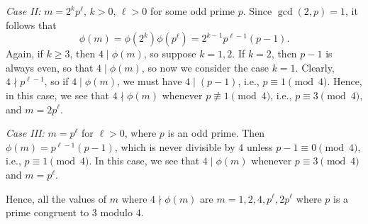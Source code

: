 \documentclass{article}
\begin{document}
\begin{exercise}[Chapter 11, \#2]
\begin{solution}
\textit{Case II:} $m = 2^kp^\ell$, $k > 0$, $\ell > 0$ for some odd prime $p$. Since $\gcd(2, p) = 1$, it follows that
$$\phi(m) = \phi(2^k)\phi(p^\ell) = 2^{k-1}p^{\ell - 1}(p - 1).$$
Again, if $k\geq 3$, then $4\mid \phi(m)$, so suppose $k = 1, 2$. If $k=2$, then $p-1$ is always even, so that $4\mid \phi(m)$, so now we consider the case $k=1$. Clearly, $4\nmid p^{\ell- 1}$, so if $4\mid \phi(m)$, we must have $4\mid (p-1)$, i.e., $p\equiv 1\pmod 4$. Hence, in this case, we see that $4\nmid \phi(m)$ whenever $p\not\equiv 1\pmod 4$, i.e., $p\equiv 3\pmod 4$, and $m = 2p^\ell$.

\textit{Case III:} $m = p^\ell$ for $\ell > 0$, where $p$ is an odd prime. Then $\phi(m) = p^{\ell-1}(p -1)$, which is never divisible by $4$ unless $p-1 \equiv 0 \pmod 4$, i.e., $p\equiv 1\pmod 4$. In this case, we see that $4\mid \phi(m)$ whenever $p\equiv 3\pmod 4$ and $m = p^\ell$.

Hence, all the values of $m$ where $4\nmid \phi(m)$ are $\boxed{m = 1, 2, 4, p^\ell, 2p^\ell}$ where $p$ is a prime congruent to $3$ modulo $4$.
\end{solution}
\end{exercise}
\end{document}
